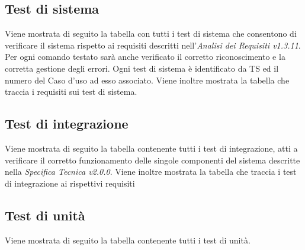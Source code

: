 \documentclass[a4paper]{article}
\begin{document}
					
	\subsection{Test di sistema}
		Viene mostrata di seguito la tabella con tutti i test di sistema che consentono di verificare il sistema rispetto ai requisiti descritti nell'\emph{Analisi dei Requisiti v1.3.11}.
		Per ogni comando testato sarà anche verificato il corretto riconoscimento e la corretta gestione degli errori.
		Ogni test di sistema è identificato da TS ed il numero del Caso d'uso ad esso associato.
		Viene inoltre mostrata la tabella che traccia i requisiti sui test di sistema.
		
	\subsection{Test di integrazione}
		Viene mostrata di seguito la tabella contenente tutti i test di integrazione, atti a verificare il corretto funzionamento delle singole componenti del sistema descritte nella \emph{Specifica Tecnica v2.0.0}. 
		Viene inoltre mostrata la tabella che traccia i test di integrazione ai rispettivi requisiti
	
	\subsection{Test di unità}
		Viene mostrata di seguito la tabella contenente tutti i test di unità. 
		
		
			
\end{document}
